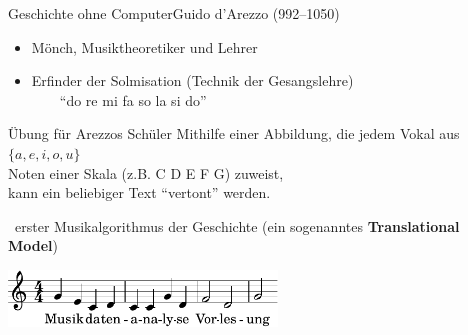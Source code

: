 \begin{frame}[t]{Geschichte ohne Computer}{Guido d'Arezzo (992--1050)}

	
	\begin{itemize}
		\item Mönch, Musiktheoretiker und Lehrer 
		\item Erfinder der Solmisation (Technik der Gesangslehre)\\
		~~~\conclude~\enquote{do re mi fa so la si do}\\
	\end{itemize}
	
	\begin{infobox}[.75\textwidth]{Übung für Arezzos Schüler}
		Mithilfe einer Abbildung, die jedem Vokal aus $\{a,e,i,o,u\}$\\Noten einer Skala (z.B. C D E F G) zuweist,\\kann ein beliebiger Text \enquote{vertont} werden.
	\end{infobox}

	\medskip
	\conclude~erster Musikalgorithmus der Geschichte (ein sogenanntes \textbf{Translational Model})

	\medskip
	\hfill\includegraphics[height=1.5cm]{lily/Arezzo.pdf}
\end{frame}

